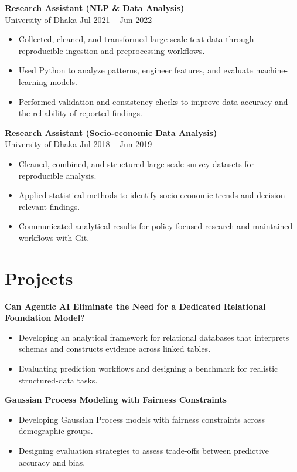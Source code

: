 \documentclass[10pt, letterpaper]{article}
\begin{document}
   \textbf{Research Assistant (NLP \& Data Analysis)} \\
   University of Dhaka \hfill Jul 2021 -- Jun 2022
   \begin{itemize}
    \item Collected, cleaned, and transformed large-scale text data through reproducible ingestion and preprocessing workflows.
    \item Used Python to analyze patterns, engineer features, and evaluate machine-learning models.
    \item Performed validation and consistency checks to improve data accuracy and the reliability of reported findings.
\end{itemize}

\textbf{Research Assistant (Socio-economic Data Analysis)} \\
University of Dhaka \hfill Jul 2018 -- Jun 2019
\begin{itemize}
    \item Cleaned, combined, and structured large-scale survey datasets for reproducible analysis.
    \item Applied statistical methods to identify socio-economic trends and decision-relevant findings.
    \item Communicated analytical results for policy-focused research and maintained workflows with Git.
\end{itemize}

    
    \section*{Projects}
    \textbf{Can Agentic AI Eliminate the Need for a Dedicated Relational Foundation Model?}
    \begin{itemize}
        \item Developing an analytical framework for relational databases that interprets schemas and constructs evidence across linked tables.
        \item Evaluating prediction workflows and designing a benchmark for realistic structured-data tasks.
    \end{itemize}

    \textbf{Gaussian Process Modeling with Fairness Constraints} \\
    \begin{itemize}
    \item Developing Gaussian Process models with fairness constraints across demographic groups.
    \item Designing evaluation strategies to assess trade-offs between predictive accuracy and bias.
    \end{itemize}
\end{document}
